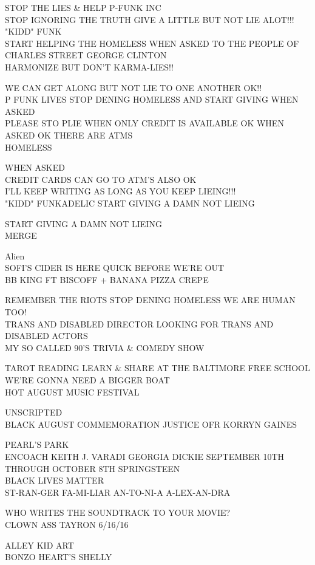 \documentclass[10pt,letterpaper]{article}
\begin{document}
STOP THE LIES \& HELP P{-}FUNK INC\\
STOP IGNORING THE TRUTH GIVE A LITTLE BUT NOT LIE ALOT!!! "KIDD" FUNK\\
START HELPING THE HOMELESS WHEN ASKED TO THE PEOPLE OF CHARLES STREET GEORGE CLINTON\\
HARMONIZE BUT DON'T KARMA{-}LIES!!

WE CAN GET ALONG BUT NOT LIE TO ONE ANOTHER OK!!\\
P FUNK LIVES STOP DENING HOMELESS AND START GIVING WHEN ASKED\\
PLEASE STO PLIE WHEN ONLY CREDIT IS AVAILABLE OK WHEN ASKED OK THERE ARE ATMS\\
HOMELESS

WHEN ASKED\\
CREDIT CARDS CAN GO TO ATM'S ALSO OK\\
I'LL KEEP WRITING AS LONG AS YOU KEEP LIEING!!!\\
"KIDD" FUNKADELIC START GIVING A DAMN NOT LIEING

START GIVING A DAMN NOT LIEING\\
MERGE

Alien\\
SOFI'S CIDER IS HERE QUICK BEFORE WE'RE OUT\\
BB KING FT BISCOFF + BANANA PIZZA CREPE

REMEMBER THE RIOTS STOP DENING HOMELESS WE ARE HUMAN TOO!\\
TRANS AND DISABLED DIRECTOR LOOKING FOR TRANS AND DISABLED ACTORS\\
MY SO CALLED 90'S TRIVIA \& COMEDY SHOW

TAROT READING LEARN \& SHARE AT THE BALTIMORE FREE SCHOOL\\
WE'RE GONNA NEED A BIGGER BOAT\\
HOT AUGUST MUSIC FESTIVAL

UNSCRIPTED\\
BLACK AUGUST COMMEMORATION JUSTICE OFR KORRYN GAINES

PEARL'S PARK\\
ENCOACH KEITH J. VARADI GEORGIA DICKIE SEPTEMBER 10TH THROUGH OCTOBER 8TH SPRINGSTEEN\\
BLACK LIVES MATTER\\
ST{-}RAN{-}GER FA{-}MI{-}LIAR AN{-}TO{-}NI{-}A A{-}LEX{-}AN{-}DRA

WHO WRITES THE SOUNDTRACK TO YOUR MOVIE?\\
CLOWN ASS TAYRON 6/16/16

ALLEY KID ART\\
BONZO HEART'S SHELLY
\end{document}
